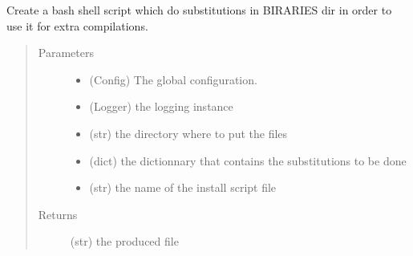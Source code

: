 \documentclass[a4paper,10pt,english]{sphinxmanual}
\begin{document}

\begin{fulllineitems}
\label{\detokenize{apidoc_commands/commands:commands.package.produce_install_bin_file}}
Create a bash shell script which do substitutions in BIRARIES dir 
in order to use it for extra compilations.
\begin{quote}\begin{description}
\item[{Parameters}] \leavevmode\begin{itemize}
\item {} 
 \textendash{} (Config) The global configuration.

\item {} 
 \textendash{} (Logger) the logging instance

\item {} 
 \textendash{} (str) the directory where to put the files

\item {} 
 \textendash{} (dict) 
the dictionnary that contains the substitutions to be done

\item {} 
 \textendash{} (str) the name of the install script file

\end{itemize}

\item[{Returns}] \leavevmode
(str) the produced file

\end{description}\end{quote}

\end{fulllineitems}

\end{document}
